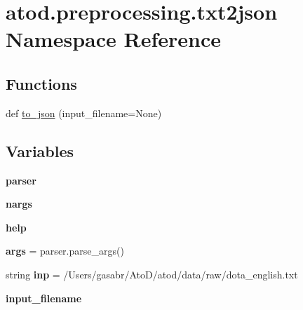 \hypertarget{namespaceatod_1_1preprocessing_1_1txt2json}{}\section{atod.\+preprocessing.\+txt2json Namespace Reference}
\label{namespaceatod_1_1preprocessing_1_1txt2json}
\subsection*{Functions}
\begin{DoxyCompactItemize}
\item 
def \hyperlink{namespaceatod_1_1preprocessing_1_1txt2json_ace5fa94be98418412b26a5450e13ce8a}{to\+\_\+json} (input\+\_\+filename=None)
\end{DoxyCompactItemize}
\subsection*{Variables}
\begin{DoxyCompactItemize}
\item 
{\bfseries parser}
\item 
{\bfseries nargs}\hypertarget{namespaceatod_1_1preprocessing_1_1txt2json_ac7d8aa77392d8abe38d1f988ad4485fe}{}\label{namespaceatod_1_1preprocessing_1_1txt2json_ac7d8aa77392d8abe38d1f988ad4485fe}

\item 
{\bfseries help}\hypertarget{namespaceatod_1_1preprocessing_1_1txt2json_aecf9df1dc8992dd95f426c075ed156f4}{}\label{namespaceatod_1_1preprocessing_1_1txt2json_aecf9df1dc8992dd95f426c075ed156f4}

\item 
{\bfseries args} = parser.\+parse\+\_\+args()\hypertarget{namespaceatod_1_1preprocessing_1_1txt2json_aa36d79058d993f55643bd8d941fe8cea}{}\label{namespaceatod_1_1preprocessing_1_1txt2json_aa36d79058d993f55643bd8d941fe8cea}

\item 
string {\bfseries inp} = \textquotesingle{}/Users/gasabr/AtoD/atod/data/raw/dota\+\_\+english.\+txt\textquotesingle{}\hypertarget{namespaceatod_1_1preprocessing_1_1txt2json_a03357aea25a1a55c551259b872984d06}{}\label{namespaceatod_1_1preprocessing_1_1txt2json_a03357aea25a1a55c551259b872984d06}

\item 
{\bfseries input\+\_\+filename}\hypertarget{namespaceatod_1_1preprocessing_1_1txt2json_a585002d20e8799c0e5f2b944f0bfbb13}{}\label{namespaceatod_1_1preprocessing_1_1txt2json_a585002d20e8799c0e5f2b944f0bfbb13}

\end{DoxyCompactItemize}


